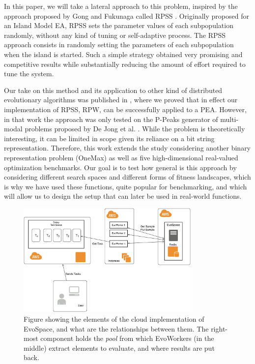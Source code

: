 \documentclass[conference]{IEEEtran}
\begin{document}
In this paper, we will take a lateral approach to this problem,
inspired by the approach proposed by Gong and Fukunaga called RPSS
\cite{fuku1,fuku2}.  Originally proposed for an Island Model EA, RPSS
sets the parameter values of each subpopulation randomly, without any
kind of tuning or self-adaptive process. The RPSS approach consists in
randomly setting the parameters of each subpopulation when the island
is started. Such a simple strategy obtained very promising and
competitive results while substantially reducing the amount of effort
required to tune the system.

Our take on this method and its application to other kind of
distributed evolutionary algorithms was published in
\cite{LNCS86720702}, where we proved that in effect our implementation
of RPSS, RPW, can be successfully applied to a PEA. However, in that
work the approach was only tested on the P-Peaks generator of
multi-modal problems proposed by De Jong et al. \cite{Jong:PS97}.
While the problem is theoretically interesting, it can be limited in
scope given its reliance on a bit string representation. Therefore,
this work extends the study considering another binary representation
problem (OneMax) as well as five high-dimensional real-valued
optimization benchmarks. Our goal is to test how general is this
approach by considering different search spaces and different forms of
fitness landscapes, which is why we have used these functions, quite
popular for benchmarking, and which will allow us to design the setup
that can later be used in real-world functions.

\begin{figure}[h!tbp]
    \centering
        \includegraphics[width=9cm]{img/EvoSpaceAWS.png}
    \caption{Figure showing the elements of the cloud implementation of EvoSpace, and what are the relationships between them. The right-most component holds the {\em pool} from which EvoWorkers (in the middle) extract elements to evaluate, and where results are put back.}
    \label{fig:evospace}
  \end{figure}
%
\end{document}
